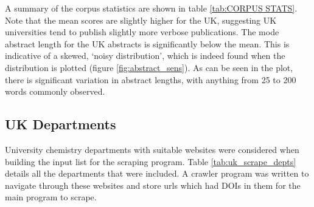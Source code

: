 \newpage
A summary of the corpus statistics are shown in table \ref{tab:CORPUS STATS}.
Note that the mean scores are slightly higher for the UK, suggesting UK universities tend to publish slightly more verbose publications. The mode abstract length for the UK abstracts is significantly below the mean. This is indicative of a skewed, `noisy distribution', which is indeed found when the distribution is plotted (figure \ref{fig:abstract_sens}).
As can be seen in the plot, there is significant variation in abstract lengths, with anything from 25 to 200 words commonly observed.
\label{sec:SCRAPEANALYSIS}


\subsection{UK Departments}
University chemistry departments with suitable websites were considered when building the input list for the scraping program. Table \ref{tab:uk_scrape_depts} details all the departments that were included. A crawler program was written to navigate through these websites and store urls which had DOIs in them for the main program to scrape.
